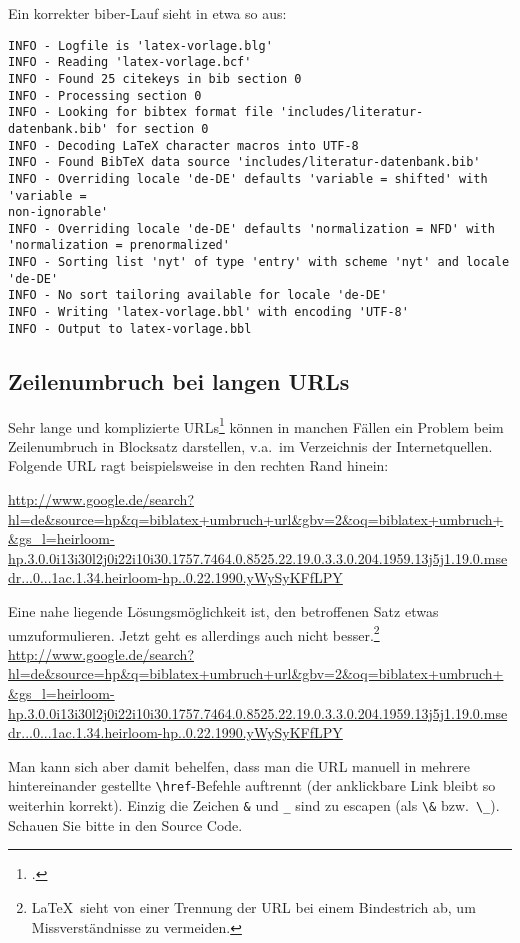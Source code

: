 Ein korrekter biber-Lauf sieht in etwa so aus:
{\small
\begin{verbatim}
INFO - Logfile is 'latex-vorlage.blg'
INFO - Reading 'latex-vorlage.bcf'
INFO - Found 25 citekeys in bib section 0
INFO - Processing section 0
INFO - Looking for bibtex format file 'includes/literatur-datenbank.bib' for section 0
INFO - Decoding LaTeX character macros into UTF-8
INFO - Found BibTeX data source 'includes/literatur-datenbank.bib'
INFO - Overriding locale 'de-DE' defaults 'variable = shifted' with 'variable = 
non-ignorable'
INFO - Overriding locale 'de-DE' defaults 'normalization = NFD' with 
'normalization = prenormalized'
INFO - Sorting list 'nyt' of type 'entry' with scheme 'nyt' and locale 'de-DE'
INFO - No sort tailoring available for locale 'de-DE'
INFO - Writing 'latex-vorlage.bbl' with encoding 'UTF-8'
INFO - Output to latex-vorlage.bbl 
\end{verbatim}
}

\subsection{Zeilenumbruch bei langen URLs}
Sehr lange und komplizierte URLs\footcite{langeURL} können in manchen Fällen ein Problem beim Zeilenumbruch in Blocksatz darstellen, v.a.\ im Verzeichnis der Internetquellen. Folgende URL ragt beispielsweise in den rechten Rand hinein: 

\url{http://www.google.de/search?hl=de&source=hp&q=biblatex+umbruch+url&gbv=2&oq=biblatex+umbruch+&gs_l=heirloom-hp.3.0.0i13i30l2j0i22i10i30.1757.7464.0.8525.22.19.0.3.3.0.204.1959.13j5j1.19.0.msedr...0...1ac.1.34.heirloom-hp..0.22.1990.yWySyKFfLPY}

Eine nahe liegende Lösungsmöglichkeit ist, den betroffenen Satz etwas umzuformulieren.
Jetzt geht es allerdings auch nicht besser.\footnote{%
\LaTeX\ sieht von einer Trennung der URL bei einem Bindestrich ab, um Missverständnisse zu vermeiden.
}
\url{http://www.google.de/search?hl=de&source=hp&q=biblatex+umbruch+url&gbv=2&oq=biblatex+umbruch+&gs_l=heirloom-hp.3.0.0i13i30l2j0i22i10i30.1757.7464.0.8525.22.19.0.3.3.0.204.1959.13j5j1.19.0.msedr...0...1ac.1.34.heirloom-hp..0.22.1990.yWySyKFfLPY}

Man kann sich aber damit behelfen, dass man die URL manuell in mehrere hintereinander gestellte \verb|\href|-Befehle auftrennt (der anklickbare Link bleibt so weiterhin korrekt). Einzig die Zeichen \verb|&| und \verb|_| sind zu escapen (als \verb|\&| bzw.\ \verb|\_|). Schauen Sie bitte in den Source Code.

